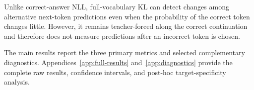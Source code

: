 Unlike correct-answer NLL, full-vocabulary KL can detect changes among
alternative next-token predictions even when the probability of the correct
token changes little. However, it remains teacher-forced along the correct
continuation and therefore does not measure predictions after an incorrect
token is chosen.

The main results report the three primary metrics and selected complementary
diagnostics. Appendices~\ref{app:full-results} and~\ref{app:diagnostics}
provide the complete raw results, confidence intervals, and post-hoc
target-specificity analysis.
